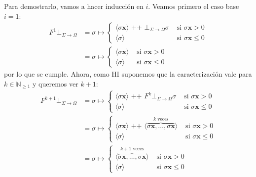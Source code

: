 \documentclass{article}
\newcommand{\N}{\mathbb{N}}
\newcommand{\x}{\textbf{x}}
\newcommand{\concat}{\texttt{ ++ }}
\newcommand{\cdomfo}{\Sigma \to \Omega}
\newcommand{\cfbotfo}{\bot_{\cdomfo}}
\newcommand{\cout}[1]{\langle #1\rangle}
\begin{document}
Para demostrarlo, vamos a hacer inducción en $i$.
Veamos primero el caso base $i = 1$:
\begin{equation*}
  \begin{aligned}
    F^1 \cfbotfo &= \sigma \mapsto \begin{cases}
                  \cout{\sigma\x} \concat \cfbotfo\sigma &\text{ si }\sigma\x > 0 \\ 
                  \cout{\sigma} &\text{ si }\sigma\x \leq 0
                \end{cases} \\
                &= \sigma \mapsto \begin{cases}
                  \cout{\sigma\x} &\text{ si }\sigma\x > 0 \\ 
                  \cout{\sigma} &\text{ si }\sigma\x \leq 0
                \end{cases}
  \end{aligned}
\end{equation*}
por lo que se cumple.
Ahora, como HI suponemos que la caracterización vale para $k \in \N_{\geq 1}$ y queremos ver $k+1$:
\begin{equation*}
  \begin{aligned}
    F^{k+1} \cfbotfo &= \sigma \mapsto \begin{cases}
                      \cout{\sigma\x} \concat F^k \cfbotfo \sigma &\text{ si }\sigma\x > 0 \\ 
                      \cout{\sigma} &\text{ si }\sigma\x \leq 0
                    \end{cases} \\ 
                     &= \sigma \mapsto \begin{cases}
                       \cout{\sigma\x} \concat \cout{\overbrace{\sigma\x, \dots, \sigma\x}^{k \text{ veces}}} &\text{ si } \sigma\x > 0 \\ 
                       \cout{\sigma} &\text{ si }\sigma\x \leq 0
                     \end{cases} \\ 
                     &= \sigma \mapsto \begin{cases}
                       \cout{\overbrace{\sigma\x, \dots, \sigma\x}^{k+1 \text{ veces}}} &\text{ si }\sigma\x > 0 \\ 
                       \cout{\sigma} &\text{ si }\sigma\x \leq 0
                     \end{cases}
  \end{aligned}
\end{equation*}
\end{document}

